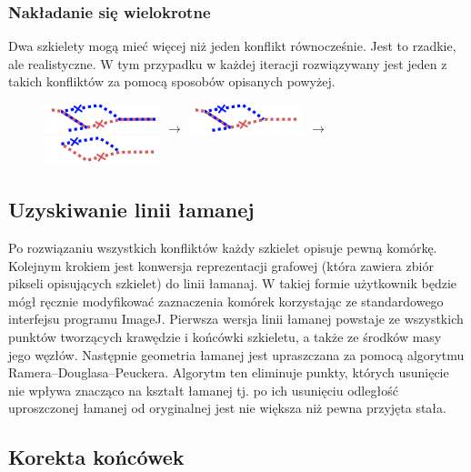 \documentclass[declaration,shortabstract,mgr]{iithesis}
\begin{document}
\subsubsection{Nakładanie się wielokrotne}

Dwa szkielety mogą mieć więcej niż jeden konflikt równocześnie. Jest to rzadkie, ale realistyczne.
W tym przypadku w każdej iteracji rozwiązywany jest jeden z takich konfliktów za pomocą sposobów opisanych powyżej.

\begin{figure}[H]
  \centering
  \includegraphics[valign=m,width=0.3\textwidth]{images/overlap-multi.png}
  $\rightarrow$
  \includegraphics[valign=m,width=0.3\textwidth]{images/overlap-multi-solved1.png}
  $\rightarrow$
  \includegraphics[valign=m,width=0.3\textwidth]{images/overlap-multi-solved2.png}
\end{figure}

\subsection{Uzyskiwanie linii łamanej}

Po rozwiązaniu wszystkich konfliktów każdy szkielet opisuje pewną komórkę.
Kolejnym krokiem jest konwersja reprezentacji grafowej (która zawiera zbiór pikseli opisujących szkielet) do linii łamanaj.
W takiej formie użytkownik będzie mógł ręcznie modyfikować zaznaczenia komórek korzystając ze standardowego interfejsu programu ImageJ.
Pierwsza wersja linii łamanej powstaje ze wszystkich punktów tworzących krawędzie i końcówki szkieletu, a także ze środków masy jego węzłów.
Następnie geometria łamanej jest upraszczana za pomocą algorytmu Ramera--Douglasa--Peuckera\cite{algo:ramer}\cite{algo:douglas-peucker}.
Algorytm ten eliminuje punkty, których usunięcie nie wpływa znacząco na kształt łamanej tj. po ich usunięciu odległość uproszczonej łamanej od oryginalnej jest nie większa niż pewna przyjęta stała.

\subsection{Korekta końcówek}
\label{sec:correct-endpoints}
\end{document}
